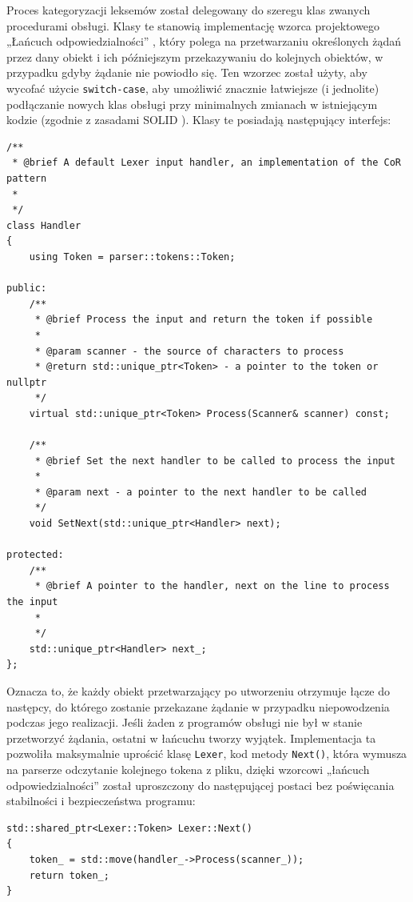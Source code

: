 Proces kategoryzacji leksemów został delegowany do szeregu klas zwanych procedurami obsługi. Klasy te stanowią implementację wzorca projektowego „Łańcuch odpowiedzialności” \cite{cor}, który polega na przetwarzaniu określonych żądań przez dany obiekt i ich późniejszym przekazywaniu do kolejnych obiektów, w przypadku gdyby żądanie nie powiodło się. Ten wzorzec został użyty, aby wycofać użycie \texttt{switch-case}, aby umożliwić znacznie łatwiejsze (i jednolite) podłączanie nowych klas obsługi przy minimalnych zmianach w istniejącym kodzie (zgodnie z zasadami SOLID \cite{solid}). Klasy te posiadają następujący interfejs:

\begin{lstlisting}[label=list:handler,caption=Klasa Handler,basicstyle=\footnotesize\ttfamily]
/**
 * @brief A default Lexer input handler, an implementation of the CoR pattern
 * 
 */
class Handler
{
    using Token = parser::tokens::Token;
    
public:
    /**
     * @brief Process the input and return the token if possible
     * 
     * @param scanner - the source of characters to process
     * @return std::unique_ptr<Token> - a pointer to the token or nullptr 
     */
    virtual std::unique_ptr<Token> Process(Scanner& scanner) const;
    
    /**
     * @brief Set the next handler to be called to process the input
     * 
     * @param next - a pointer to the next handler to be called
     */
    void SetNext(std::unique_ptr<Handler> next);
    
protected:
    /**
     * @brief A pointer to the handler, next on the line to process the input
     * 
     */
    std::unique_ptr<Handler> next_;
};
\end{lstlisting}

Oznacza to, że każdy obiekt przetwarzający po utworzeniu otrzymuje łącze do następcy, do którego zostanie przekazane żądanie w przypadku niepowodzenia podczas jego realizacji. Jeśli żaden z programów obsługi nie był w stanie przetworzyć żądania, ostatni w łańcuchu tworzy wyjątek. Implementacja ta pozwoliła maksymalnie uprościć klasę \texttt{Lexer}, kod metody \texttt{Next()}, która wymusza na parserze odczytanie kolejnego tokena z pliku, dzięki wzorcowi „łańcuch odpowiedzialności” \cite{cor} został uproszczony do następującej postaci bez poświęcania stabilności i bezpieczeństwa programu:

\begin{lstlisting}[label=list:scanner,caption=Metoda Lexer::Next(),basicstyle=\footnotesize\ttfamily]
std::shared_ptr<Lexer::Token> Lexer::Next()
{
    token_ = std::move(handler_->Process(scanner_));
    return token_;
}
\end{lstlisting}

